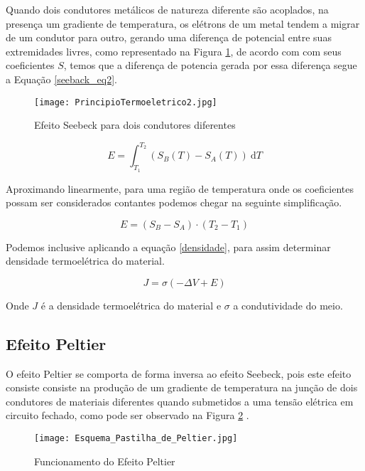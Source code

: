 \documentclass[a4paper,12pt]{report}
\begin{document}
	\noindent Quando dois condutores metálicos de natureza diferente são acoplados, na presença um gradiente de temperatura, os elétrons de um metal tendem a migrar de um condutor para outro, gerando uma diferença de potencial entre suas extremidades livres, como representado na Figura \ref{seebeck2}, de acordo com com seus coeficientes $S$, temos que a diferença de potencia gerada por essa diferença segue a Equação \ref{seeback_eq2}.
	
	\begin{figure}[htbp]
		\centering
		\texttt{[image: PrincipioTermoeletrico2.jpg]}
		\caption{Efeito Seebeck para dois condutores diferentes}
		\label{seebeck2}
	\end{figure}
	
	\begin{equation}
	E = \int_{T_{1}}^{T_{2}} (S_{B}(T) - S_{A}(T))~\mathrm{d}T
	\label{seeback_eq2}
	\end{equation}
	
	\noindent Aproximando linearmente, para uma região de temperatura  onde os coeficientes possam ser considerados contantes podemos chegar na seguinte simplificação.
	
	\begin{equation}
	E = (S_{B} - S_{A}) \cdot  (T_{2} - T_{1})
	\end{equation}
	
	\noindent Podemos inclusive aplicando a equação \ref{densidade}, para assim determinar densidade termoelétrica do material.
	
	\begin{equation}
	J = \sigma (-\Delta V + E)
	\label{densidade}
	\end{equation}
	
	\noindent Onde $J$ é a densidade termoelétrica do material e $\sigma$ a condutividade do meio.
	
	\subsection{Efeito Peltier}
	O efeito Peltier se comporta de forma inversa ao efeito Seebeck, pois este efeito consiste consiste na produção de um gradiente de temperatura na junção de dois condutores de materiais diferentes quando submetidos a uma tensão elétrica em circuito fechado, como pode ser observado na Figura \ref{peltier} . 
	
	\begin{figure}[htbp]
		\centering
		\texttt{[image: Esquema\_Pastilha\_de\_Peltier.jpg]}
		\caption{Funcionamento do Efeito Peltier}
		\label{peltier}
	\end{figure}
	
\end{document}
